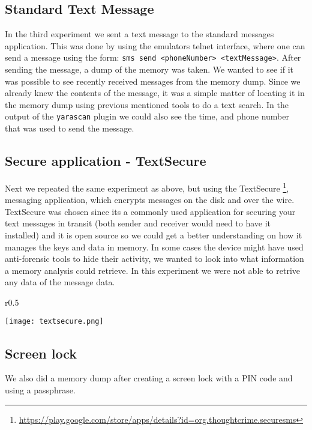 \subsection{Standard Text Message}
In the third experiment we sent a text message to the standard messages application.
This was done by using the emulators telnet interface, where one can send a message
using the form: \texttt{sms send <phoneNumber> <textMessage>}. After sending the
message, a dump of the memory was taken. We wanted to see if it was possible to 
see recently received messages from the memory dump. Since we already knew the 
contents of the message, it was a simple matter of locating it in the memory 
dump using previous mentioned tools to do a text search. In the output of the
\texttt{yarascan} plugin we could also see the time, and phone number that was
used to send the message.
  
\subsection{Secure application - TextSecure}
Next we repeated the same experiment as above, but using the TextSecure
\footnote{\url{https://play.google.com/store/apps/details?id=org.thoughtcrime.securesms}}, 
messaging application, which encrypts messages on the disk and over the wire.
TextSecure was chosen since its a commonly used application for securing your 
text messages in transit (both sender and receiver would need to have it 
installed) and it is open source so we could get a better understanding on 
how it manages the keys and data in memory.  
In some cases the device might have used anti-forensic tools to hide their 
activity, we wanted to look into what information a memory analysis could 
retrieve. In this experiment we were not able to retrive any data of the message 
data.
\begin{wrapfigure}{r}{0.5\textwidth}
    \begin{center}
        \texttt{[image: textsecure.png]}
    \end{center}
    \vspace{-20pt}                                                                                                                                                                 
\end{wrapfigure}

\subsection{Screen lock}
We also did a memory dump after creating a screen lock with a PIN code and using a passphrase.
